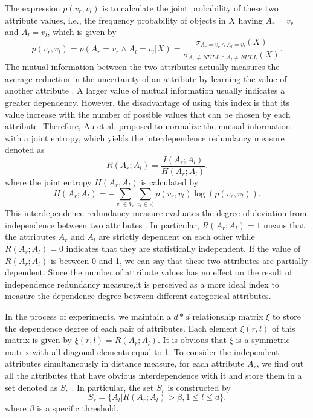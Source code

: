 \documentclass[review]{elsarticle}
\begin{document}
The expression $p(v_{r},v_{l})$ is to calculate the joint probability of these two attribute values, i.e., the frequency probability of objects in $X$ having $A_r = v_{r}$ and $A_l = v_{l}$, which is given by
\begin{equation}
p(v_{r},v_{l}) = p(A_r = v_{r} \wedge A_l = v_{l}|X) = \frac{\sigma_{A_r = v_{r} \wedge A_l = v_{l}}(X)}{\sigma_{A_r \neq NULL \wedge A_l \neq NULL}(X)}.
\label{equ11}
\end{equation}
The mutual information between the two attributes actually measures the average reduction in the uncertainty of an attribute by learning the value of another attribute \cite{MacKay2003Information}. A larger value of mutual information usually indicates a greater dependency. However, the disadvantage of using this index is that its value increase with the number of possible values that can be chosen by each attribute. Therefore, Au et al. \cite{Au2005Attribute} proposed to normalize the mutual information with a joint entropy, which yields the interdependence redundancy measure denoted as
\begin{equation}
R(A_r;A_l) = \frac{I(A_r;A_l)}{H(A_r;A_l)}.
\label{equ12}
\end{equation}
where the joint entropy $H(A_r,A_l)$ is calculated by
\begin{equation}
H(A_r;A_l) = - \sum_{v_{r} \in V_r}\sum_{v_{l} \in V_l}p(v_{r},v_{l})\log(p(v_{r},v_{l})).
\label{equ13}
\end{equation}
This interdependence redundancy measure evaluates the degree of deviation from independence between two attributes \cite{Au2005Attribute}. In particular, $R(A_r;A_l) = 1$ means that the attributes $A_r$ and $A_l$ are strictly dependent on each other while $R(A_r;A_l) = 0$ indicates that they are statistically independent. If the value of $R(A_r;A_l)$ is between 0 and 1, we can say that these two attributes are partially dependent. Since the number of attribute values has no effect on the result of independence redundancy measure,it is perceived as a more ideal index to measure the dependence degree between different categorical attributes.

In the process of experiments, we maintain a $d*d$ relationship matrix $\xi$ to store the dependence degree of each pair of attributes. Each element $\xi(r,l)$ of this matrix is given by $\xi(r,l) = R(A_r;A_l)$. It is obvious that $\xi$ is a symmetric matrix with all diagonal elements equal to 1. To consider the independent attributes simultaneously in distance measure, for each attribute $A_r$, we find out all the attributes that have obvious interdependence with it and store them in a set denoted as $S_r$ \cite{Jia2014A}. In particular, the set $S_r$ is constructed by
\begin{equation}
S_r = \{A_l|R(A_r;A_l) > \beta, 1 \leq l \leq d \}.
\label{equ14}
\end{equation}
where $\beta$ is a specific threshold.
\end{document}
